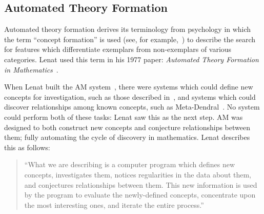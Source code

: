 \subsection{Automated Theory Formation}

Automated theory formation derives its terminology from psychology in which the
term ``concept formation'' is used (see, for example,~\cite{bruner:67}) to
describe the search for features which differentiate exemplars from
non-exemplars of various categories. Lenat used this term in his 1977 paper:
{\em Automated Theory Formation in Mathematics}~\cite{lenat:77}.

When Lenat built the AM system~\cite{lenat:77}, there were systems
which could define new concepts for investigation, such as those
described in~\cite{winston}, and systems which could discover
relationships among known concepts, such as Meta-Dendral~\cite{buchanan:75}. No
system could perform both of these tasks: Lenat saw this as the next step. AM
was designed to both construct new concepts and conjecture relationships between
them; fully automating the cycle of discovery in mathematics. Lenat describes
this as follows:

\begin{quote}
``What we are describing is a computer program which
defines new concepts, investigates them, notices
regularities in the data about them, and conjectures
relationships between them. This new information is used
by the program to evaluate the newly-defined concepts,
concentrate upon the most interesting ones, and iterate the
entire process.''~\cite[p. 834]{lenat:77}
\end{quote}

